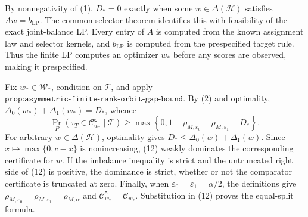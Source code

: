 By nonnegativity of (1), \(D_*=0\) exactly when some \(w\in\Delta(\mathcal H)\) satisfies \(Aw=b_{\mathrm{LP}}\). The common-selector theorem identifies this with feasibility of the exact joint-balance LP. Every entry of \(A\) is computed from the known assignment law and selector kernels, and \(b_{\mathrm{LP}}\) is computed from the prespecified target rule. Thus the finite LP computes an optimizer \(w_*\) before any scores are observed, making it prespecified.

Fix \(w_*\in\mathcal W_*\), condition on \(\mathcal T\), and apply \(\texttt{prop:asymmetric-finite-rank-orbit-gap-bound}\). By (2) and optimality, \(\Delta_0(w_*)+\Delta_1(w_*)=D_*\), whence
\[
\Pr_P\!\left(\tau_T\in\mathcal C^{\boldsymbol\varepsilon}_{w_*}\mid\mathcal T\right)\ge\max\left\{0,1-\rho_{M,\varepsilon_0}-\rho_{M,\varepsilon_1}-D_*\right\}.
\tag{12}
\]
For arbitrary \(w\in\Delta(\mathcal H)\), optimality gives \(D_*\le\Delta_0(w)+\Delta_1(w)\). Since \(x\mapsto\max\{0,c-x\}\) is nonincreasing, (12) weakly dominates the corresponding certificate for \(w\). If the imbalance inequality is strict and the untruncated right side of (12) is positive, the dominance is strict, whether or not the comparator certificate is truncated at zero. Finally, when \(\varepsilon_0=\varepsilon_1=\alpha/2\), the definitions give \(\rho_{M,\varepsilon_0}=\rho_{M,\varepsilon_1}=\rho_{M,\alpha}\) and \(\mathcal C^{\boldsymbol\varepsilon}_{w_*}=\mathcal C_{w_*}\). Substitution in (12) proves the equal-split formula.